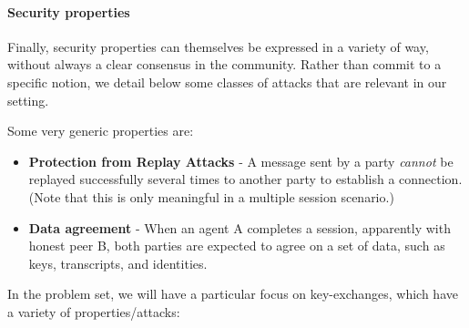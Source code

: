 \documentclass[11pt]{article}
\begin{document}
\paragraph{Security properties}
Finally, security properties can themselves be expressed in a variety of way, without always a clear consensus in the community. Rather than commit to a specific notion, we detail below some classes of attacks that are relevant in our setting.

Some very generic properties are:
\begin{itemize}
\item \textbf{Protection from Replay Attacks} - A message sent by a party \emph{cannot} be replayed successfully several times to another party to establish a connection. (Note that this is only meaningful in a multiple session scenario.)
\item \textbf{Data agreement} - When an agent A completes a session, apparently with honest peer B, both parties are expected to agree on a set of data, such as keys, transcripts, and identities.
\end{itemize}
In the problem set, we will have a particular focus on key-exchanges, which have a variety of properties/attacks:
\end{document}
